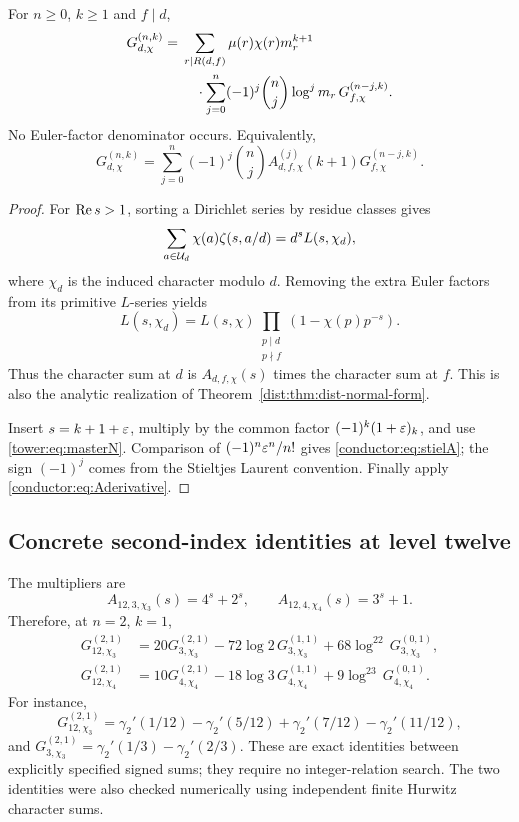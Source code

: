 \begin{theorem}\label{conductor:thm:stieltjes}
For $n\ge0$, $k\ge1$ and $f\mid d$,
\begin{align}\label{conductor:eq:stieldescent}
G_{d,\chi}^{(n,k)}
={}&\sum_{r\mid R(d,f)}\mu(r)\chi(r)m_r^{k+1}\notag\\
&\quad\cdot\sum_{j=0}^{n}(-1)^j\binom nj\log^j m_r\,
G_{f,\chi}^{(n-j,k)}.
\end{align}
No Euler-factor denominator occurs. Equivalently,
\begin{equation}\label{conductor:eq:stielA}
G_{d,\chi}^{(n,k)}=
\sum_{j=0}^{n}(-1)^j\binom nj A_{d,f,\chi}^{(j)}(k+1)
G_{f,\chi}^{(n-j,k)}.
\end{equation}
\end{theorem}
\begin{proof}
For $\operatorname{Re} s>1$, sorting a Dirichlet series by residue classes gives
\[
\sum_{a\in\mathcal U_d}\chi(a)\zeta(s,a/d)=d^sL(s,\chi_d),
\]
where $\chi_d$ is the induced character modulo $d$. Removing the extra
Euler factors from its primitive $L$-series yields
\[
L(s,\chi_d)=L(s,\chi)
\prod_{\substack{p\mid d\\p\nmid f}}(1-\chi(p)p^{-s}).
\]
Thus the character sum at $d$ is $A_{d,f,\chi}(s)$ times the character
sum at $f$. This is also the analytic realization of
Theorem~\ref{dist:thm:dist-normal-form}.

Insert $s=k+1+\varepsilon$, multiply by the common factor
$(-1)^k(1+\varepsilon)_k$, and use \eqref{tower:eq:masterN}. Comparison of
$(-1)^n\varepsilon^n/n!$ gives \eqref{conductor:eq:stielA}; the sign $(-1)^j$ comes
from the Stieltjes Laurent convention. Finally apply
\eqref{conductor:eq:Aderivative}.
\end{proof}

\subsection{Concrete second-index identities at level twelve}

The multipliers are
\[
A_{12,3,\chi_3}(s)=4^s+2^s,\qquad
A_{12,4,\chi_4}(s)=3^s+1.
\]
Therefore, at $n=2$, $k=1$,
\begin{align}\label{conductor:eq:examplegamma}
G_{12,\chi_3}^{(2,1)}
&=20G_{3,\chi_3}^{(2,1)}
-72\log2\,G_{3,\chi_3}^{(1,1)}
+68\log^22\,G_{3,\chi_3}^{(0,1)},\\
G_{12,\chi_4}^{(2,1)}
&=10G_{4,\chi_4}^{(2,1)}
-18\log3\,G_{4,\chi_4}^{(1,1)}
+9\log^23\,G_{4,\chi_4}^{(0,1)}.
\end{align}
For instance,
\[
G_{12,\chi_3}^{(2,1)}=
\gamma_2'(1/12)-\gamma_2'(5/12)+\gamma_2'(7/12)-\gamma_2'(11/12),
\]
and $G_{3,\chi_3}^{(2,1)}=\gamma_2'(1/3)-\gamma_2'(2/3)$.
These are exact identities between explicitly specified signed sums; they
require no integer-relation search. The two identities were also checked
numerically using independent finite Hurwitz character sums.


